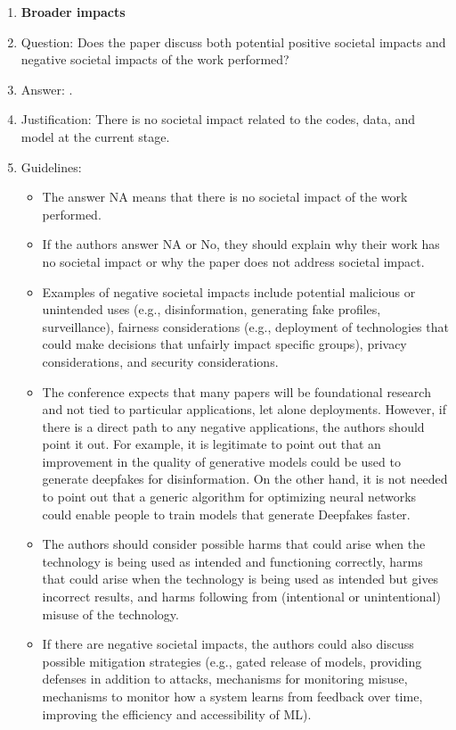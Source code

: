 \documentclass{article}
\begin{document}
\begin{enumerate}
\item {\bf Broader impacts}
    \item[] Question: Does the paper discuss both potential positive societal impacts and negative societal impacts of the work performed?
    \item[] Answer: \answerNA{}. %
    \item[] Justification: There is no societal impact related to the codes, data, and model at the current stage.
    \item[] Guidelines:
    \begin{itemize}
        \item The answer NA means that there is no societal impact of the work performed.
        \item If the authors answer NA or No, they should explain why their work has no societal impact or why the paper does not address societal impact.
        \item Examples of negative societal impacts include potential malicious or unintended uses (e.g., disinformation, generating fake profiles, surveillance), fairness considerations (e.g., deployment of technologies that could make decisions that unfairly impact specific groups), privacy considerations, and security considerations.
        \item The conference expects that many papers will be foundational research and not tied to particular applications, let alone deployments. However, if there is a direct path to any negative applications, the authors should point it out. For example, it is legitimate to point out that an improvement in the quality of generative models could be used to generate deepfakes for disinformation. On the other hand, it is not needed to point out that a generic algorithm for optimizing neural networks could enable people to train models that generate Deepfakes faster.
        \item The authors should consider possible harms that could arise when the technology is being used as intended and functioning correctly, harms that could arise when the technology is being used as intended but gives incorrect results, and harms following from (intentional or unintentional) misuse of the technology.
        \item If there are negative societal impacts, the authors could also discuss possible mitigation strategies (e.g., gated release of models, providing defenses in addition to attacks, mechanisms for monitoring misuse, mechanisms to monitor how a system learns from feedback over time, improving the efficiency and accessibility of ML).
    \end{itemize}
    

\end{enumerate}
\end{document}
